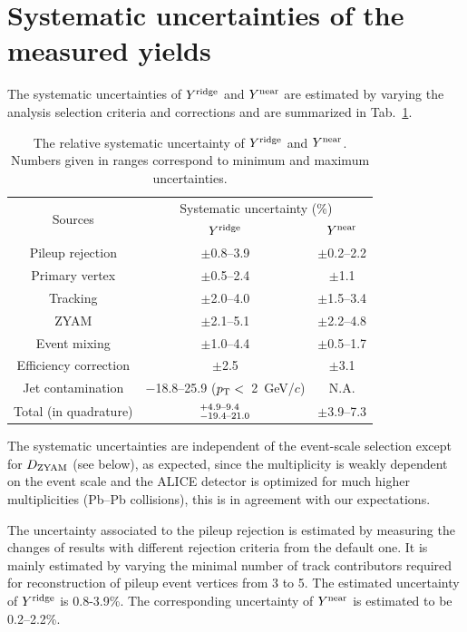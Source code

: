 \section{Systematic uncertainties of the measured yields}
\label{sec:uncertainties}

The systematic uncertainties of $Y^{\rm{ridge}}$ and $Y^{\rm{near}}$ are estimated by varying the analysis selection criteria and corrections and are summarized in Tab.~\ref{tab:syst}.

\begin{table}[h!]
\caption{The relative systematic uncertainty of $Y^{\rm{ridge}}$ and $Y^{\rm{near}}$. Numbers given in ranges correspond to minimum and maximum uncertainties.}
\centering
\begin{tabular}{c|cc}
\hline 
\multirow{2}{*}{Sources}  & \multicolumn{2}{c}{Systematic uncertainty (\%)} \\\cline{2-3} 
         & $Y^{\rm{ridge}}$ & $Y^{\rm{near}}$ \\ \hline 
Pileup rejection    	& $\pm$0.8--3.9    &$\pm$0.2--2.2	\\ 
Primary vertex	        & $\pm$0.5--2.4	   &$\pm$1.1	\\ 
Tracking		        & $\pm$2.0--4.0    &$\pm$1.5--3.4	\\ 
ZYAM		        	& $\pm$2.1--5.1	   &$\pm$2.2--4.8	\\ 
Event mixing	    	& $\pm$1.0--4.4	   &$\pm$0.5--1.7	\\ 
Efficiency correction	& $\pm$2.5 	    &$\pm$3.1	\\  
Jet contamination   	& $-$18.8--25.9 ($p_\mathrm{T}<$~2~GeV/$c$)	&N.A.	\\ \hline 
Total (in quadrature)			& $^{+\rm{4.9}\textrm{--}\rm{9.4}}_{-\rm{19.4}\textrm{--}\rm{21.0}}$ & $\pm$3.9--7.3 \\ 
\hline 
\end{tabular}
\label{tab:syst}
\end{table}

The systematic uncertainties are independent of the event-scale selection except for $D_{\rm{ZYAM}}$ (see below), as expected, since the multiplicity is weakly dependent on the event scale and the ALICE detector is optimized for much higher multiplicities (Pb--Pb collisions), this is in agreement with our expectations.

The uncertainty associated to the pileup rejection is estimated by measuring the changes of results with different rejection criteria from the default one. It is mainly estimated by varying the minimal number of track contributors required for reconstruction of pileup event vertices from 3 to 5. The estimated uncertainty of $Y^{\rm{ridge}}$ is 0.8-3.9\%. The corresponding uncertainty of $Y^{\rm{near}}$ is estimated to be 0.2--2.2\%.
 
